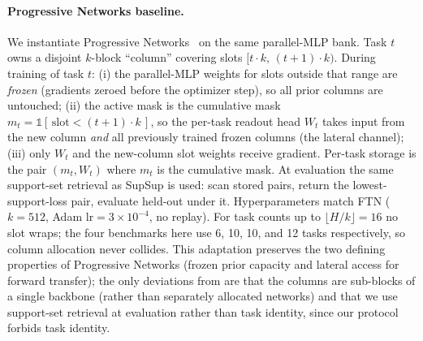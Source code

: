 \documentclass[11pt]{article}
\begin{document}
\paragraph{Progressive Networks baseline.}
We instantiate Progressive Networks~\citep{rusu2016progressive} on the same parallel-MLP bank. Task $t$ owns a disjoint $k$-block ``column'' covering slots $[t\cdot k,\,(t+1)\cdot k)$. During training of task $t$: (i) the parallel-MLP weights for slots outside that range are \emph{frozen} (gradients zeroed before the optimizer step), so all prior columns are untouched; (ii) the active mask is the cumulative mask $m_t = \mathbb{1}\!\left[\,\mathrm{slot} < (t+1)\cdot k\,\right]$, so the per-task readout head $W_t$ takes input from the new column \emph{and} all previously trained frozen columns (the lateral channel); (iii) only $W_t$ and the new-column slot weights receive gradient. Per-task storage is the pair $(m_t, W_t)$ where $m_t$ is the cumulative mask. At evaluation the same support-set retrieval as SupSup is used: scan stored pairs, return the lowest-support-loss pair, evaluate held-out under it. Hyperparameters match FTN ($k=512$, Adam $\mathrm{lr}=3\times10^{-4}$, no replay). For task counts up to $\lfloor H/k \rfloor = 16$ no slot wraps; the four benchmarks here use 6, 10, 10, and 12 tasks respectively, so column allocation never collides. This adaptation preserves the two defining properties of Progressive Networks (frozen prior capacity and lateral access for forward transfer); the only deviations from \citet{rusu2016progressive} are that the columns are sub-blocks of a single backbone (rather than separately allocated networks) and that we use support-set retrieval at evaluation rather than task identity, since our protocol forbids task identity.

% 

\end{document}
